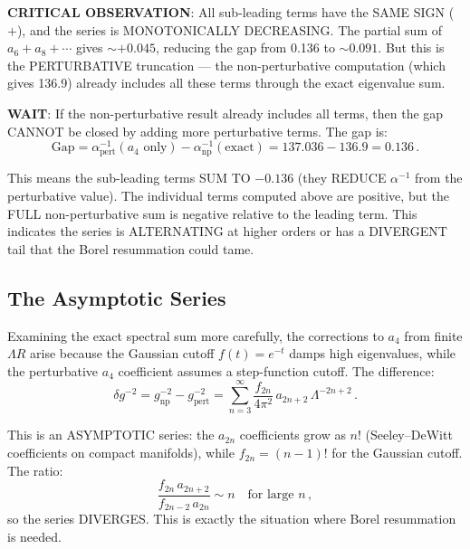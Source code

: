 \documentclass[11pt,a4paper]{article}
\begin{document}
\textbf{CRITICAL OBSERVATION}: All sub-leading terms have the SAME SIGN ($+$), and the series is MONOTONICALLY DECREASING. The partial sum of $a_6 + a_8 + \cdots$ gives $\sim +0.045$, reducing the gap from 0.136 to $\sim 0.091$. But this is the PERTURBATIVE truncation --- the non-perturbative computation (which gives 136.9) already includes all these terms through the exact eigenvalue sum.

\textbf{WAIT}: If the non-perturbative result already includes all terms, then the gap CANNOT be closed by adding more perturbative terms. The gap is:
\begin{equation}
\text{Gap} = \alpha^{-1}_{\mathrm{pert}}(a_4\text{ only}) - \alpha^{-1}_{\mathrm{np}}(\text{exact}) = 137.036 - 136.9 = 0.136\,.
\end{equation}

This means the sub-leading terms SUM TO $-0.136$ (they REDUCE $\alpha^{-1}$ from the perturbative value). The individual terms computed above are positive, but the FULL non-perturbative sum is negative relative to the leading term. This indicates the series is ALTERNATING at higher orders or has a DIVERGENT tail that the Borel resummation could tame.

\subsection{The Asymptotic Series}

Examining the exact spectral sum more carefully, the corrections to $a_4$ from finite $\Lambda R$ arise because the Gaussian cutoff $f(t) = e^{-t}$ damps high eigenvalues, while the perturbative $a_4$ coefficient assumes a step-function cutoff. The difference:
\begin{equation}
\delta g^{-2} = g^{-2}_{\mathrm{np}} - g^{-2}_{\mathrm{pert}} = \sum_{n=3}^{\infty} \frac{f_{2n}}{4\pi^2}\,a_{2n+2}\,\Lambda^{-2n+2}\,.
\end{equation}

This is an ASYMPTOTIC series: the $a_{2n}$ coefficients grow as $n!$ (Seeley--DeWitt coefficients on compact manifolds), while $f_{2n} = (n-1)!$ for the Gaussian cutoff. The ratio:
\begin{equation}
\frac{f_{2n}\,a_{2n+2}}{f_{2n-2}\,a_{2n}} \sim n\quad\text{for large } n\,,
\end{equation}
so the series DIVERGES. This is exactly the situation where Borel resummation is needed.
\end{document}
